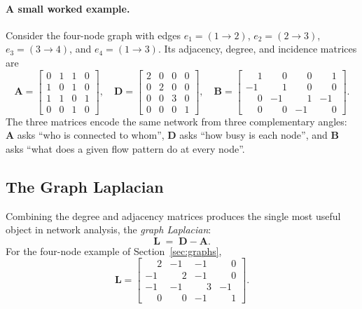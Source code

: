 \documentclass[11pt,a4paper]{article}
\newcommand{\mat}[1]{\mathbf{#1}}
\begin{document}
\paragraph{A small worked example.}
Consider the four-node graph with edges
$e_1 = (1 \to 2)$, $e_2 = (2 \to 3)$, $e_3 = (3 \to 4)$, and
$e_4 = (1 \to 3)$. Its adjacency, degree, and incidence matrices are
\[
\mat{A} =
\begin{bmatrix}
  0 & 1 & 1 & 0 \\
  1 & 0 & 1 & 0 \\
  1 & 1 & 0 & 1 \\
  0 & 0 & 1 & 0
\end{bmatrix},
\quad
\mat{D} =
\begin{bmatrix}
  2 & 0 & 0 & 0 \\
  0 & 2 & 0 & 0 \\
  0 & 0 & 3 & 0 \\
  0 & 0 & 0 & 1
\end{bmatrix},
\quad
\mat{B} =
\begin{bmatrix}
  \phantom{-}1 & \phantom{-}0 & \phantom{-}0 & \phantom{-}1 \\
  -1 & \phantom{-}1 & \phantom{-}0 & \phantom{-}0 \\
  \phantom{-}0 & -1 & \phantom{-}1 & -1 \\
  \phantom{-}0 & \phantom{-}0 & -1 & \phantom{-}0
\end{bmatrix}.
\]
The three matrices encode the same network from three complementary
angles: $\mat{A}$ asks ``who is connected to whom'', $\mat{D}$ asks
``how busy is each node'', and $\mat{B}$ asks ``what does a given flow
pattern do at every node''.

\subsection{The Graph Laplacian}
\label{sec:laplacian}

Combining the degree and adjacency matrices produces the single most
useful object in network analysis, the \emph{graph Laplacian}:
\begin{equation}
  \mat{L} \;=\; \mat{D} - \mat{A}.
  \label{eq:laplacian}
\end{equation}
For the four-node example of Section~\ref{sec:graphs},
\[
\mat{L} =
\begin{bmatrix}
  \phantom{-}2 & -1 & -1 & \phantom{-}0 \\
  -1 & \phantom{-}2 & -1 & \phantom{-}0 \\
  -1 & -1 & \phantom{-}3 & -1 \\
  \phantom{-}0 & \phantom{-}0 & -1 & \phantom{-}1
\end{bmatrix}.
\]
\end{document}
